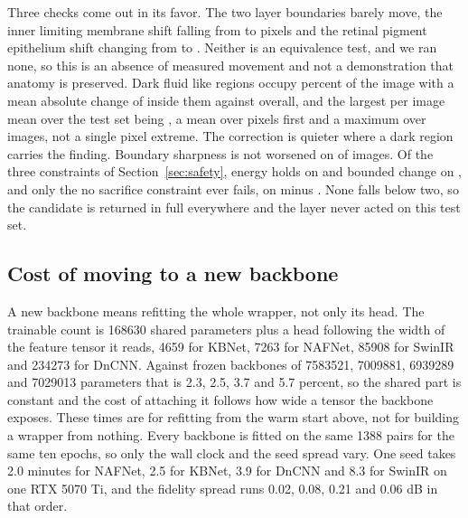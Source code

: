 Three checks come out in its favor. The two layer boundaries barely move, the inner limiting
membrane shift falling from \IlmShiftBack{} to \IlmShiftCorr{} pixels and the retinal pigment
epithelium shift changing from \RpeShiftBack{} to \RpeShiftCorr{}. Neither is an equivalence test,
and we ran none, so this is an absence of measured movement and not a demonstration that anatomy is
preserved. Dark fluid like regions occupy
\DarkFrac{} percent of the image with a mean absolute change of \DarkChange{} inside them against
\GlobalChange{} overall, and the largest per image mean over the test set being
\GlobalMax{}, a mean over pixels first and a maximum over images, not a single pixel extreme. The
correction is quieter where a dark region carries the finding. Boundary sharpness is not worsened on \BoundOK{} of
\NImages{} images. Of the three constraints of Section~\ref{sec:safety}, energy holds
on \ConEnergy{} and bounded change on \ConLip{}, and only the no sacrifice constraint ever fails, on
\NImages{} minus \ConPareto{}. None falls below two, so the candidate is returned in full everywhere
and the layer never acted on this test set.

\subsection{Cost of moving to a new backbone}
\label{sec:transfer_cost}
A new backbone means refitting the whole wrapper, not only its head. The trainable count is
\num{168630} shared parameters plus a head following the width of the feature tensor it reads,
\num{4659} for KBNet, \num{7263} for NAFNet, \num{85908} for SwinIR and \num{234273} for DnCNN. Against frozen backbones of \num{7583521}, \num{7009881},
\num{6939289} and \num{7029013} parameters that is 2.3, 2.5, 3.7 and 5.7 percent, so the shared part
is constant and the cost of attaching it follows how wide a tensor the backbone exposes. These times are for refitting from
the warm start above, not for building a wrapper from nothing. Every backbone is fitted on the same
1388 pairs for the same ten epochs, so only the wall clock and the seed spread vary. One seed takes
2.0 minutes for NAFNet, 2.5 for KBNet, 3.9 for DnCNN and 8.3 for SwinIR on one RTX 5070 Ti, and the
fidelity spread runs 0.02, 0.08, 0.21 and 0.06 dB in that order.
